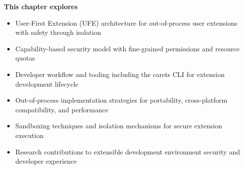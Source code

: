 \begin{tcolorbox}[
    enhanced,
    colback=white,
    colframe=brandPrimary!40,
    boxrule=1pt,
    arc=12pt,
    drop shadow={brandPrimary!20},
    left=1.5cm,
    right=1.5cm,
    top=1.2cm,
    bottom=1.2cm,
    before upper={\parindent0pt}
]
\begin{center}
{\Large\textbf{\textcolor{brandPrimary}{This chapter explores}}}
\end{center}

\vspace{0.8cm}

\begin{itemize}[leftmargin=1.2cm, itemsep=0.4cm, label={\textcolor{brandAccent}{$\triangleright$}}]
    \item {\large User-First Extension (UFE) architecture for out-of-process user extensions with safety through isolation}
    \item {\large Capability-based security model with fine-grained permissions and resource quotas}
    \item {\large Developer workflow and tooling including the carets CLI for extension development lifecycle}
    \item {\large Out-of-process implementation strategies for portability, cross-platform compatibility, and performance}
    \item {\large Sandboxing techniques and isolation mechanisms for secure extension execution}
    \item {\large Research contributions to extensible development environment security and developer experience}
\end{itemize}
\end{tcolorbox}

\clearpage
